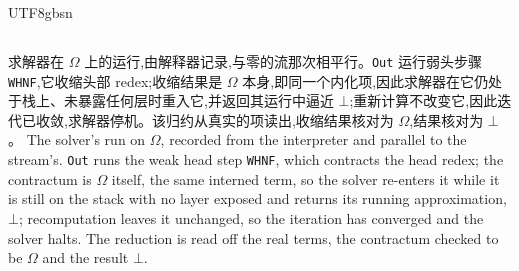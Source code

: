 \begin{CJK*}{UTF8}{gbsn}
  \subsection{}\label{app:omega-trace}
  \ifTablambdaChinese
  求解器在 $\Omega$ 上的运行,由解释器记录,与零的流那次相平行。\texttt{Out} 运行弱头步骤 \texttt{WHNF},它收缩头部 redex;收缩结果是 $\Omega$ 本身,即同一个内化项,因此求解器在它仍处于栈上、未暴露任何层时重入它,并返回其运行中逼近 $\bot$;重新计算不改变它,因此迭代已收敛,求解器停机。该归约从真实的项读出,收缩结果核对为 $\Omega$,结果核对为 $\bot$。
  \else
  The solver's run on $\Omega$, recorded from the interpreter and parallel to the stream's. \texttt{Out} runs the weak head step \texttt{WHNF}, which contracts the head redex; the contractum is $\Omega$ itself, the same interned term, so the solver re-enters it while it is still on the stack with no layer exposed and returns its running approximation, $\bot$; recomputation leaves it unchanged, so the iteration has converged and the solver halts. The reduction is read off the real terms, the contractum checked to be $\Omega$ and the result $\bot$.
  \fi
  
  \fi %

  \ifTablambdaBody\else
  
  
  \fi

  \ifTablambdaChinese\clearpage
\end{CJK*}\fi

